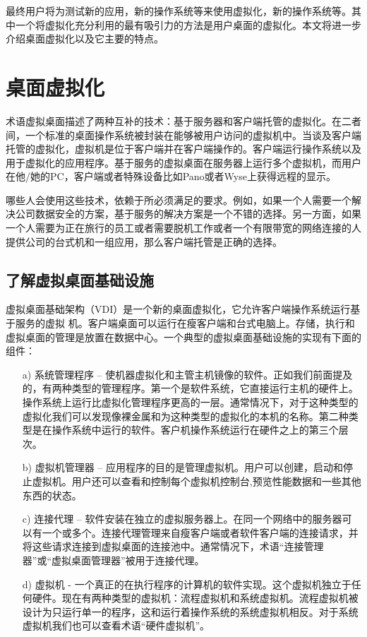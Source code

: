 \documentclass[10pt,a4paper]{article}
\begin{document}
\begin{CJK*}{UTF8}{gkai}
最终用户将为测试新的应用，新的操作系统等来使用虚拟化，新的操作系统等。其中一个将虚拟化充分利用的最有吸引力的方法是用户桌面的虚拟化。本文将进一步介绍桌面虚拟化以及它主要的特点。


\section{桌面虚拟化}
术语虚拟桌面描述了两种互补的技术：基于服务器和客户端托管的虚拟化。在二者间，一个标准的桌面操作系统被封装在能够被用户访问的虚拟机中。当谈及客户端托管的虚拟化，虚拟机是位于客户端并在客户端操作的。客户端运行操作系统以及用于虚拟化的应用程序。基于服务的虚拟桌面在服务器上运行多个虚拟机，而用户在他/她的PC，客户端或者特殊设备比如Pano或者Wyse上获得远程的显示。


哪些人会使用这些技术，依赖于所必须满足的要求。例如，如果一个人需要一个解决公司数据安全的方案，基于服务的解决方案是一个不错的选择。另一方面，如果一个人需要为正在旅行的员工或者需要脱机工作或者一个有限带宽的网络连接的人提供公司的台式机和一组应用，那么客户端托管是正确的选择。


\subsection{了解虚拟桌面基础设施}
虚拟桌面基础架构（VDI）是一个新的桌面虚拟化，它允许客户端操作系统运行基于服务的虚拟 
机。客户端桌面可以运行在瘦客户端和台式电脑上。存储，执行和虚拟桌面的管理是放置在数据中心。一个典型的虚拟桌面基础设施的实现有下面的组件：
\begin{itemize}
\item[a)] 系统管理程序 – 使机器虚拟化和主管主机镜像的软件。正如我们前面提及的，有两种类型的管理程序。第一个是软件系统，它直接运行主机的硬件上。操作系统上运行比虚拟化管理程序更高的一层。通常情况下，对于这种类型的虚拟化我们可以发现像裸金属和为这种类型的虚拟化的本机的名称。第二种类型是在操作系统中运行的软件。客户机操作系统运行在硬件之上的第三个层次。
\item[b)] 虚拟机管理器 – 应用程序的目的是管理虚拟机。用户可以创建，启动和停止虚拟机。用户还可以查看和控制每个虚拟机控制台,预览性能数据和一些其他东西的状态。
\item[c)] 连接代理 – 软件安装在独立的虚拟服务器上。在同一个网络中的服务器可以有一个或多个。连接代理管理来自瘦客户端或者软件客户端的连接请求，并将这些请求连接到虚拟桌面的连接池中。通常情况下，术语“连接管理器”或“虚拟桌面管理器”被用于连接代理。
\item[d)] 虚拟机 - 一个真正的在执行程序的计算机的软件实现。这个虚拟机独立于任何硬件。现在有两种类型的虚拟机：流程虚拟机和系统虚拟机。流程虚拟机被设计为只运行单一的程序，这和运行着操作系统的系统虚拟机相反。对于系统虚拟机我们也可以查看术语“硬件虚拟机”。
\end{itemize} 


\end{CJK*}
\end{document}
